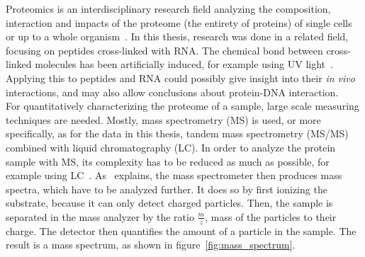 	Proteomics is an interdisciplinary research field analyzing the composition, interaction and impacts of the proteome (the entirety of proteins) of single cells or up to a whole organism~\cite{Han2008, Sachsenberg2017}. In this thesis, research was done in a related field, focusing on peptides cross-linked with RNA. The chemical bond between cross-linked molecules has been artificially induced, for example using UV light~\cite{Sachsenberg2017}. Applying this to peptides and RNA could possibly give insight into their \textit{in vivo} interactions, and may also allow conclusions about protein-DNA interaction.\\
	For quantitatively characterizing the proteome of a sample, large scale measuring techniques are needed. Mostly, mass spectrometry (MS) is used, or more specifically, as for the data in this thesis, tandem mass spectrometry (MS/MS) combined with liquid chromatography (LC). In order to analyze the protein sample with MS, its complexity has to be reduced as much as possible, for example using LC~\cite{Sachsenberg2017}. As~\citet{Han2008} explains, the mass spectrometer then produces mass spectra, which have to be analyzed further. It does so by first ionizing the substrate, because it can only detect charged particles. Then, the sample is separated in the mass analyzer by the ratio $\frac{m}{z}$, mass of the particles to their charge. The detector then quantifies the amount of a particle in the sample. The result is a mass spectrum, as shown in figure~\ref{fig:mass_spectrum}.\\

